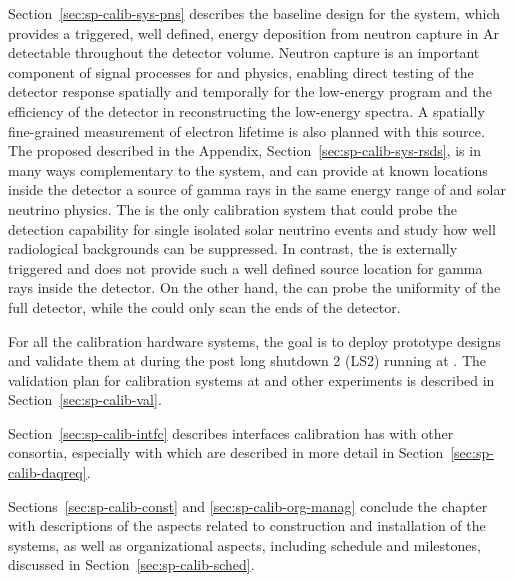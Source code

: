 Section~\ref{sec:sp-calib-sys-pns} describes the baseline design for the  system, which provides a triggered, well defined, energy deposition from neutron capture in Ar detectable throughout the detector volume. Neutron capture is an important component of signal processes for  and  physics, enabling direct testing of the detector response spatially and temporally for the low-energy program and the efficiency of the detector in reconstructing the low-energy spectra. A spatially fine-grained measurement of electron lifetime is also planned with this source.
The proposed  described in the Appendix, Section~\ref{sec:sp-calib-sys-rsds}, 
is in many ways complementary to the 
system, and can provide at known locations inside the detector a source of gamma rays in the same energy range of  and solar neutrino physics. %
The  is the only calibration system that could probe the detection capability for single isolated solar neutrino events and study how well radiological backgrounds can be suppressed. In contrast, the  is externally triggered and does not provide such a well defined source location for gamma rays inside the detector. On the other hand, the  can probe the uniformity of the full detector, while the  could only scan the ends of the detector.  


For all the calibration hardware systems, the goal is to deploy prototype designs and validate them at  during the post long shutdown 2 (LS2) running  at . The validation plan for calibration systems at  and other experiments is described in Section~\ref{sec:sp-calib-val}. 

Section~\ref{sec:sp-calib-intfc} describes interfaces calibration has with other  consortia, especially  with  which are described in more detail in Section~\ref{sec:sp-calib-daqreq}. 

Sections~\ref{sec:sp-calib-const} and \ref{sec:sp-calib-org-manag} conclude the chapter with descriptions of the aspects related to construction and installation of the systems, as well as organizational aspects, including schedule and milestones, discussed in Section~\ref{sec:sp-calib-sched}.

